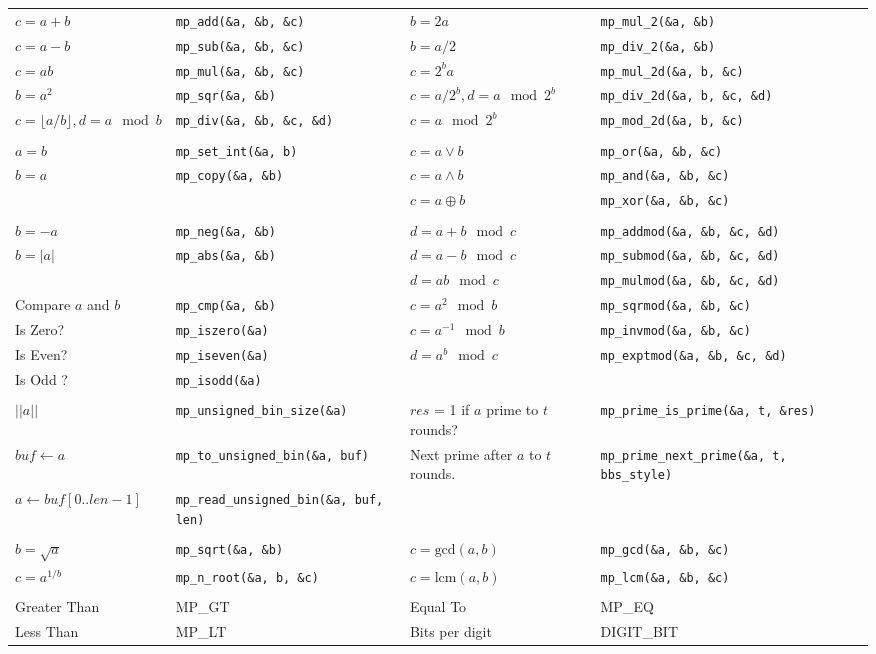 \documentclass[landscape,11pt]{article}
\begin{document}
\hspace*{-3in}
\begin{tabular}{llllll}
$c = a + b$  & {\tt mp\_add(\&a, \&b, \&c)} & $b = 2a$  & {\tt mp\_mul\_2(\&a, \&b)} & \\
$c = a - b$  & {\tt mp\_sub(\&a, \&b, \&c)} & $b = a/2$ & {\tt mp\_div\_2(\&a, \&b)} & \\
$c = ab $   & {\tt mp\_mul(\&a, \&b, \&c)}  & $c = 2^ba$  & {\tt mp\_mul\_2d(\&a, b, \&c)}  \\
$b = a^2 $  & {\tt mp\_sqr(\&a, \&b)}       & $c = a/2^b, d = a \mod 2^b$ & {\tt mp\_div\_2d(\&a, b, \&c, \&d)} \\
$c = \lfloor a/b \rfloor, d = a \mod b$ & {\tt mp\_div(\&a, \&b, \&c, \&d)} & $c = a \mod 2^b $  & {\tt mp\_mod\_2d(\&a, b, \&c)}  \\
 && \\
$a = b $  & {\tt mp\_set\_int(\&a, b)}  & $c = a \vee b$  & {\tt mp\_or(\&a, \&b, \&c)}  \\
$b = a $  & {\tt mp\_copy(\&a, \&b)} & $c = a \wedge b$  & {\tt mp\_and(\&a, \&b, \&c)}  \\
 && $c = a \oplus b$  & {\tt mp\_xor(\&a, \&b, \&c)}  \\
 & \\
$b = -a $  & {\tt mp\_neg(\&a, \&b)}  & $d = a + b \mod c$  & {\tt mp\_addmod(\&a, \&b, \&c, \&d)}  \\
$b = |a| $  & {\tt mp\_abs(\&a, \&b)} & $d = a - b \mod c$  & {\tt mp\_submod(\&a, \&b, \&c, \&d)}  \\
 && $d = ab \mod c$  & {\tt mp\_mulmod(\&a, \&b, \&c, \&d)}  \\
Compare $a$ and $b$ & {\tt mp\_cmp(\&a, \&b)} & $c = a^2 \mod b$  & {\tt mp\_sqrmod(\&a, \&b, \&c)}  \\
Is Zero? & {\tt mp\_iszero(\&a)} & $c = a^{-1} \mod b$  & {\tt mp\_invmod(\&a, \&b, \&c)} \\
Is Even? & {\tt mp\_iseven(\&a)} & $d = a^b \mod c$ & {\tt mp\_exptmod(\&a, \&b, \&c, \&d)} \\
Is Odd ? & {\tt mp\_isodd(\&a)} \\
&\\
$\vert \vert a \vert \vert$ & {\tt mp\_unsigned\_bin\_size(\&a)} & $res$ = 1 if $a$ prime to $t$ rounds? & {\tt mp\_prime\_is\_prime(\&a, t, \&res)} \\
$buf \leftarrow a$          & {\tt mp\_to\_unsigned\_bin(\&a, buf)} & Next prime after $a$ to $t$ rounds. & {\tt mp\_prime\_next\_prime(\&a, t, bbs\_style)} \\
$a \leftarrow buf[0..len-1]$          & {\tt mp\_read\_unsigned\_bin(\&a, buf, len)} \\
&\\
$b = \sqrt{a}$ & {\tt mp\_sqrt(\&a, \&b)}  & $c = \mbox{gcd}(a, b)$ & {\tt mp\_gcd(\&a, \&b, \&c)} \\
$c = a^{1/b}$ & {\tt mp\_n\_root(\&a, b, \&c)} & $c = \mbox{lcm}(a, b)$ & {\tt mp\_lcm(\&a, \&b, \&c)} \\
&\\
Greater Than & MP\_GT & Equal To & MP\_EQ \\
Less Than & MP\_LT & Bits per digit & DIGIT\_BIT \\
\end{tabular}
\end{document}
